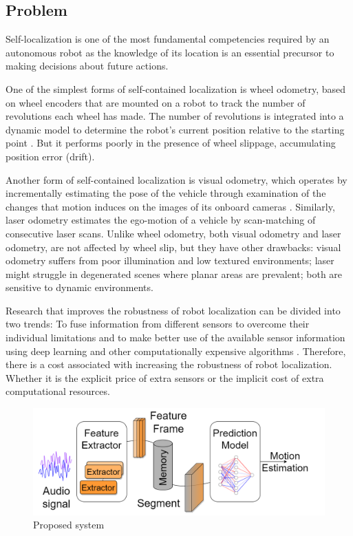 \subsection{Problem} \label{subsec:problem}

Self-localization is one of the most fundamental competencies required by an
autonomous robot as the knowledge of its location is an essential precursor to
making decisions about future actions.

One of the simplest forms of self-contained localization is wheel odometry,
based on wheel encoders that are mounted on a robot to track the number of
revolutions each wheel has made. The number of revolutions is integrated into a
dynamic model to determine the robot's current position relative to the
starting point \cite{OdometrySurvey}. But it performs poorly in the presence of
wheel slippage, accumulating position error (drift).

Another form of self-contained localization is visual odometry, which operates
by incrementally estimating the pose of the vehicle through examination of the
changes that motion induces on the images of its onboard cameras
\cite{ScaramuzzaTutorial}. Similarly, laser odometry estimates the ego-motion
of a vehicle by scan-matching of consecutive laser scans. Unlike wheel
odometry, both visual odometry and laser odometry, are not affected by wheel
slip, but they have other drawbacks: visual odometry suffers from poor
illumination and low textured environments; laser might struggle in degenerated
scenes where planar areas are prevalent; both are sensitive to dynamic
environments.

Research that improves the robustness of robot localization can be divided into
two trends: To fuse information from different sensors to overcome their
individual limitations \cite{Valente2019,Vargas2021,Ojeda2006} and to make
better use of the available sensor information using deep learning and other
computationally expensive algorithms \cite{Long2021,DFVO}. Therefore, there is
a cost associated with increasing the robustness of robot localization. Whether
it is the explicit price of extra sensors or the implicit cost of extra
computational resources.

\begin{figure}[t]
    \centering
    \includegraphics[width=\linewidth]{content/system.drawio.png}
    \caption{Proposed system}
    \label{fig:system}
\end{figure}

